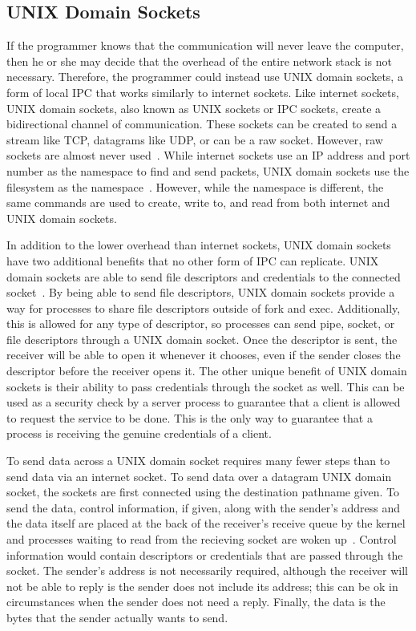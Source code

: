 \subsection{UNIX Domain Sockets}
\label{sec:unixDomainSockets}
If the programmer knows that the communication will never leave the computer, then he or she may decide that the overhead of the entire network stack is not necessary.  Therefore, the programmer could instead use UNIX domain sockets, a form of local IPC that works similarly to internet sockets.  Like internet sockets, UNIX domain sockets, also known as UNIX sockets or IPC sockets, create a bidirectional channel of communication.  These sockets can be created to send a stream like TCP, datagrams like UDP, or can be a raw socket.  However, raw sockets are almost never used~\cite[229--230]{Stevens:1996:TIT:233130}.  While internet sockets use an IP address and port number as the namespace to find and send packets, UNIX domain sockets use the filesystem as the namespace~\cite[231]{Stevens:1996:TIT:233130}.  However, while the namespace is different, the same commands are used to create, write to, and read from both internet and UNIX domain sockets.

In addition to the lower overhead than internet sockets, UNIX domain sockets have two additional benefits that no other form of IPC can replicate.  UNIX domain sockets are able to send file descriptors and credentials to the connected socket~\cite[381--394]{Stevens:1997:UNP:522800}.  By being able to send file descriptors, UNIX domain sockets provide a way for processes to share file descriptors outside of fork and exec.  Additionally, this is allowed for any type of descriptor, so processes can send pipe, socket, or file descriptors through a UNIX domain socket.  Once the descriptor is sent, the receiver will be able to open it whenever it chooses, even if the sender closes the descriptor before the receiver opens it.  The other unique benefit of UNIX domain sockets is their ability to pass credentials through the socket as well.  This can be used as a security check by a server process to guarantee that a client is allowed to request the service to be done.  This is the only way to guarantee that a process is receiving the genuine credentials of a client.

To send data across a UNIX domain socket requires many fewer steps than to send data via an internet socket.  To send data over a datagram UNIX domain socket, the sockets are first connected using the destination pathname given.  To send the data, control information, if given, along with the sender's address and the data itself are placed at the back of the receiver's receive queue by the kernel and processes waiting to read from the recieving socket are woken up~\cite[263--265]{Stevens:1996:TIT:233130}.  Control information would contain descriptors or credentials that are passed through the socket.  The sender's address is not necessarily required, although the receiver will not be able to reply is the sender does not include its address; this can be ok in circumstances when the sender does not need a reply.  Finally, the data is the bytes that the sender actually wants to send.

